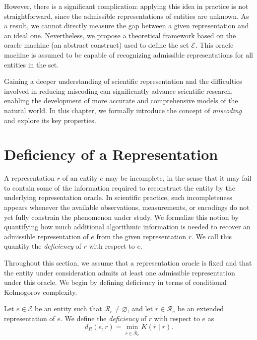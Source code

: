 However, there is a significant complication: applying this idea in practice is not straightforward, since the admissible representations of entities are unknown. As a result, we cannot directly measure the gap between a given representation and an ideal one. Nevertheless, we propose a theoretical framework based on the oracle machine (an abstract construct) used to define the set $\mathcal{E}$. This oracle machine is assumed to be capable of recognizing admissible representations for all entities in the set.

Gaining a deeper understanding of scientific representation and the difficulties involved in reducing miscoding can significantly advance scientific research, enabling the development of more accurate and comprehensive models of the natural world. In this chapter, we formally introduce the concept of \emph{miscoding} and explore its key properties.

%
%

\section{Deficiency of a Representation}
\label{sec:deficiency}

A representation $r$ of an entity $e$ may be incomplete, in the sense that it may fail to contain some of the information required to reconstruct the entity by the underlying representation oracle. In scientific practice, such incompleteness appears whenever the available observations, measurements, or encodings do not yet fully constrain the phenomenon under study. We formalize this notion by quantifying how much additional algorithmic information is needed to recover an admissible representation of $e$ from the given representation $r$. We call this quantity the \emph{deficiency} of $r$ with respect to $e$.

Throughout this section, we assume that a representation oracle is fixed and that the entity under consideration admits at least one admissible representation under this oracle. We begin by defining deficiency in terms of conditional Kolmogorov complexity.

\begin{definition}
\label{def:deficiency}
Let $e\in\mathcal E$ be an entity such that $\bar{\mathcal R}_e\neq\varnothing$, and let $r\in\mathcal R_e$ be an extended representation of $e$. We define the \emph{deficiency} of $r$ with respect to $e$ as
\[
d_R(e,r) = \min_{\bar r\in\bar{\mathcal R}_e}K(\bar r\mid r).
\]
\end{definition}


